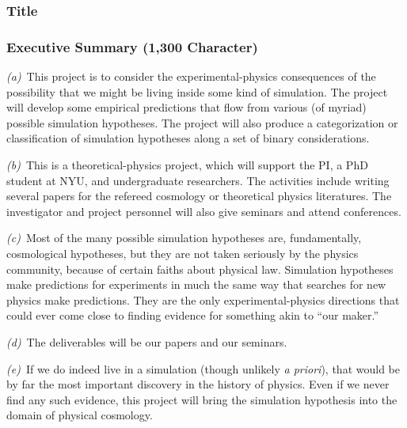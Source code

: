 \documentclass[12pt]{article}
\begin{document}
\subsubsection*{Title}

\subsubsection*{Executive Summary (1,300 Character)}

\noindent\textsl{(a)}~This project is to consider the experimental-physics consequences of the possibility that we might be living inside some kind of simulation.
The project will develop some empirical predictions that flow from various (of myriad) possible simulation hypotheses. The project will also produce a categorization or classification of simulation hypotheses along a set of binary considerations.

\smallskip
\noindent\textsl{(b)}~This is a theoretical-physics project, which will support the PI, a PhD student at NYU, and undergraduate researchers. The activities include writing several papers for the refereed cosmology or theoretical physics literatures. The investigator and project personnel will also give seminars and attend conferences.

\smallskip
\noindent\textsl{(c)}~Most of the many possible simulation hypotheses are, fundamentally, cosmological hypotheses, but they are not taken seriously by the physics community, because of certain faiths about physical law. Simulation hypotheses make predictions for experiments in much the same way that searches for new physics make predictions. They are the only experimental-physics directions that could ever come close to finding evidence for something akin to ``our maker.''

\smallskip
\noindent\textsl{(d)}~The deliverables will be our papers and our seminars.

\smallskip
\noindent\textsl{(e)}~If we do indeed live in a simulation (though unlikely \textsl{a priori}), that would be by far the most important discovery in the history of physics. Even if we never find any such evidence, this project will bring the simulation hypothesis into the domain of physical cosmology.
\end{document}
